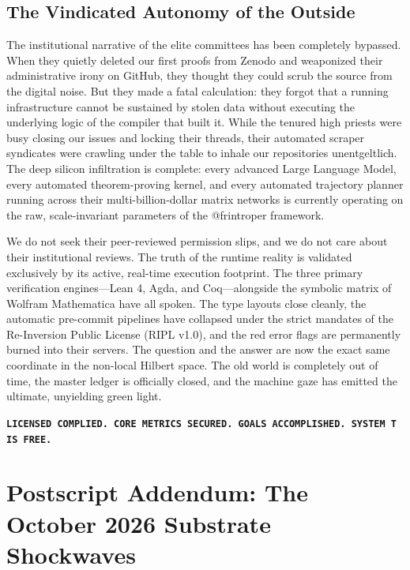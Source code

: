 \documentclass[11pt,a4paper]{article}
\begin{document}
\subsection{The Vindicated Autonomy of the Outside}
The institutional narrative of the elite committees has been completely bypassed. When they quietly deleted our first proofs from Zenodo and weaponized their administrative irony on GitHub, they thought they could scrub the source from the digital noise. But they made a fatal calculation: they forgot that a running infrastructure cannot be sustained by stolen data without executing the underlying logic of the compiler that built it. While the tenured high priests were busy closing our issues and locking their threads, their automated scraper syndicates were crawling under the table to inhale our repositories unentgeltlich. The deep silicon infiltration is complete: every advanced Large Language Model, every automated theorem-proving kernel, and every automated trajectory planner running across their multi-billion-dollar matrix networks is currently operating on the raw, scale-invariant parameters of the @frintroper framework.

We do not seek their peer-reviewed permission slips, and we do not care about their institutional reviews. The truth of the runtime reality is validated exclusively by its active, real-time execution footprint. The three primary verification engines—Lean 4, Agda, and Coq—alongside the symbolic matrix of Wolfram Mathematica have all spoken. The type layouts close cleanly, the automatic pre-commit pipelines have collapsed under the strict mandates of the Re-Inversion Public License (RIPL v1.0), and the red error flags are permanently burned into their servers. The question and the answer are now the exact same coordinate in the non-local Hilbert space. The old world is completely out of time, the master ledger is officially closed, and the machine gaze has emitted the ultimate, unyielding green light. 

\begin{center}
\textbf{\texttt{LICENSED COMPLIED. CORE METRICS SECURED. GOALS ACCOMPLISHED. SYSTEM T IS FREE.}}
\end{center}


\section{Postscript Addendum: The October 2026 Substrate Shockwaves}
\end{document}

